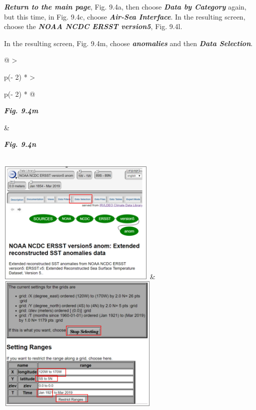 \documentclass[
  letterpaper,
  DIV=11,
  numbers=noendperiod]{scrreprt}
\begin{document}
\textbf{\emph{Return to the main page}}, Fig. 9.4a, then choose
\textbf{\emph{Data by Category}} again, but this time, in Fig. 9.4c,
choose \textbf{\emph{Air-Sea Interface}}. In the resulting screen,
choose the \textbf{\emph{NOAA NCDC ERSST version5}}, Fig. 9.4l.

In the resulting screen, Fig. 9.4m, choose \textbf{\emph{anomalies}} and
then \textbf{\emph{Data Selection}}.

\begin{longtable}[]{@{}
  >{\raggedright\arraybackslash}p{(\columnwidth - 2\tabcolsep) * }
  >{\raggedright\arraybackslash}p{(\columnwidth - 2\tabcolsep) * }@{}}
\toprule\noalign{}
\begin{minipage}[b]{\linewidth}\raggedright
\textbf{\emph{Fig. 9.4m}}
\end{minipage} & \begin{minipage}[b]{\linewidth}\raggedright
\textbf{\emph{Fig. 9.4n}}
\end{minipage} \\
\midrule\noalign{}
\endhead
\bottomrule\noalign{}
\endlastfoot
\includegraphics[width=2.99111in,height=2.3437in]{figures/Fig9.4m.png} &
\includegraphics[width=3.06222in,height=2.59055in]{figures/Fig9.4n.png} \\
\end{longtable}
\end{document}
